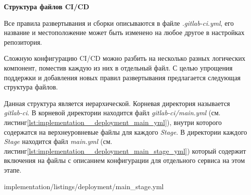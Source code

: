 \noindent \textbf{Структура файлов CI/CD}

Все правила развертывания и сборки описываются в файле \textit{.gitlab-ci.yml},
его название и местоположение может быть изменено на любое другое в настройках репозитория.

Сложную конфигурацию CI/CD можно разбить на несколько разных логических компонент, поместив каждую из них
в отдельный файл.
С целью упрощения поддержки и добавления новых правил развертывания предлагается следующая структура файлов.


\vskip 5mm
Данная структура является иерархической.
Корневая директория называется \textit{gitlab-ci}. В корневой директории находится файл
\textit{gitlab-ci/main.yml}
(см. листинг\ref{lst:implementation__deployment_main_yml}),
внутри которого содержатся на верхнеуровневые файлы для каждого \textit{Stage}.
В директории каждого \textit{Stage} находится файл \textit{main.yml} (см. листинг\ref{lst:implementation__deployment_main_stage_yml})
который содержит включения на файлы
с описанием конфигурации для отдельного сервиса на этом этапе.


\vskip 5mm


{implementation/listings/deployment/main_stage.yml}
\vskip 5mm
